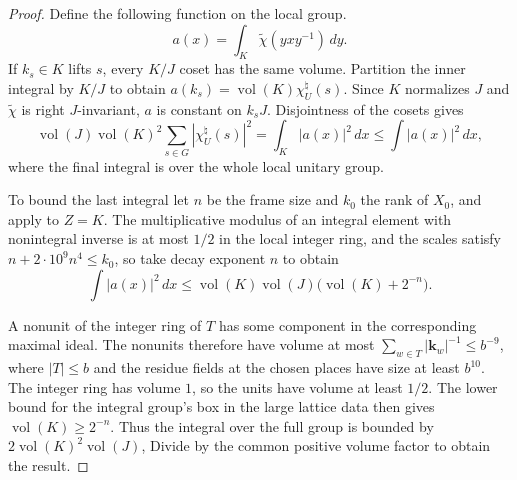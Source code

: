 \begin{proof}
Define the following function on the local group.
\[
 a(x)=\int_K\widetilde\chi(yxy^{-1})\,dy.
\]
If $k_s\in K$ lifts $s$, every $K/J$ coset has the same volume.
Partition the inner integral by $K/J$ to obtain
$a(k_s)=\operatorname{vol}(K)\chi_U^\natural(s)$.
Since $K$ normalizes $J$ and $\widetilde\chi$ is right $J$-invariant, $a$ is constant on $k_sJ$.
Disjointness of the cosets gives
\[
 \operatorname{vol}(J)\operatorname{vol}(K)^2
       \sum_{s\in G}|\chi_U^\natural(s)|^2
 =\int_K |a(x)|^2\,dx
 \le\int |a(x)|^2\,dx ,
\]
where the final integral is over the whole local unitary group.

To bound the last integral let $n$ be the frame size and $k_0$ the rank of $X_0$,
and apply  to $Z=K$. The multiplicative modulus of an integral element with nonintegral inverse
is at most $1/2$ in the local integer ring, and the scales satisfy $n+2\cdot10^9 n^4\le k_0$,
so take decay exponent $n$ to obtain
\[
 \int |a(x)|^2\,dx\le
 \operatorname{vol}(K)\operatorname{vol}(J)
             \bigl(\operatorname{vol}(K)+2^{-n}\bigr).
\]

A nonunit of the integer ring of $T$ has some component in the corresponding maximal ideal.
The nonunits therefore have volume at most $\sum_{w\in T}|\mathbf k_w|^{-1}\le b^{-9}$,
where $|T|\le b$ and the residue fields at the chosen places have size at least $b^{10}$.
The integer ring has volume $1$, so the units have volume at least $1/2$.
The lower bound for the integral group's box in the large lattice data then gives $\operatorname{vol}(K)\ge2^{-n}$.
Thus the integral over the full group is bounded by
$2\operatorname{vol}(K)^2\operatorname{vol}(J)$,
Divide by the common positive volume factor to obtain the result.
\end{proof}

